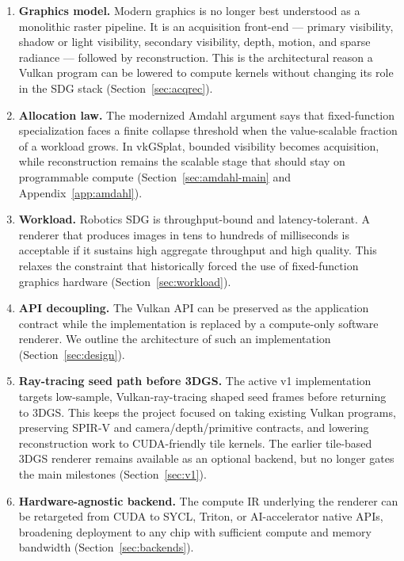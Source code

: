 \documentclass[10pt,journal]{IEEEtran}
\begin{document}
\begin{enumerate}
    \item \textbf{Graphics model.} Modern graphics is no longer best
    understood as a monolithic raster pipeline. It is an acquisition
    front-end --- primary visibility, shadow or light visibility,
    secondary visibility, depth, motion, and sparse radiance --- followed
    by reconstruction. This is the architectural reason a Vulkan program
    can be lowered to compute kernels without changing its role in the
    SDG stack (Section~\ref{sec:acqrec}).

    \item \textbf{Allocation law.} The modernized Amdahl argument says
    that fixed-function specialization faces a finite collapse threshold
    when the value-scalable fraction of a workload grows. In vkGSplat,
    bounded visibility becomes acquisition, while reconstruction remains
    the scalable stage that should stay on programmable compute
    (Section~\ref{sec:amdahl-main} and Appendix~\ref{app:amdahl}).

    \item \textbf{Workload.} Robotics SDG is throughput-bound and
    latency-tolerant. A renderer that produces images in tens to hundreds
    of milliseconds is acceptable if it sustains high aggregate throughput
    and high quality. This relaxes the constraint that historically
    forced the use of fixed-function graphics hardware
    (Section~\ref{sec:workload}).

    \item \textbf{API decoupling.} The Vulkan API can be preserved as the
    application contract while the implementation is replaced by a
    compute-only software renderer. We outline the architecture of such
    an implementation (Section~\ref{sec:design}).

    \item \textbf{Ray-tracing seed path before 3DGS.}
    The active v1 implementation targets low-sample, Vulkan-ray-tracing
    shaped seed frames before returning to 3DGS. This keeps the project
    focused on taking existing Vulkan programs, preserving SPIR-V and
    camera/depth/primitive contracts, and lowering reconstruction work
    to CUDA-friendly tile kernels. The earlier tile-based 3DGS renderer
    remains available as an optional backend, but no longer gates the
    main milestones (Section~\ref{sec:v1}).

    \item \textbf{Hardware-agnostic backend.} The compute IR underlying
    the renderer can be retargeted from CUDA to SYCL, Triton, or
    AI-accelerator native APIs, broadening deployment to any chip with
    sufficient compute and memory bandwidth (Section~\ref{sec:backends}).
\end{enumerate}
\end{document}
